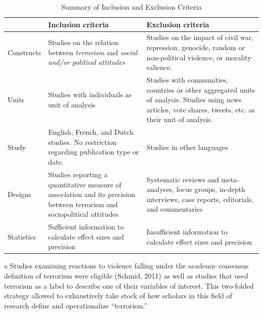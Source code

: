 \vspace{2mm}
\begin{table}[H]
\caption{Summary of Inclusion and Exclusion Criteria}
\label{tab:art4-tab1}
\small
\renewcommand{\arraystretch}{1.5} %
\begin{threeparttable}
\begin{tabular}{L{2cm}L{5.4cm}L{5.4cm}}
\hline
& \textbf{Inclusion criteria} & \textbf{Exclusion criteria} \\ \hline
Constructs & Studies on the relation between \textit{terrorism} \hspace{2mm}and \textit{social and/or political attitudes} & Studies on the impact of civil war, repression, genocide, random or non-political violence, or morality salience.  \\ 
Units & Studies with individuals as unit of analysis & Studies with communities, countries or other aggregated units of analysis. Studies using news articles, vote shares, tweets, etc. as their unit of analysis. \\ 
Study & English, French, and Dutch studies. No restriction regarding publication type or date.  & Studies in other languages \\
Designs & Studies reporting a quantitative measure of association and its precision between terrorism and sociopolitical attitudes & Systematic reviews and meta-analyses, focus groups, in-depth interviews, case reports, editorials, and commentaries \\
Statistics & Sufficient information to calculate effect sizes and precision & Insufficient information to calculate effect sizes and precision \\ \hline
\end{tabular}
\begin{tablenotes}
\vspace{-5mm}
\singlespacing
\footnotesize
\item[a] Studies examining reactions to violence falling under the academic consensus definition of terrorism were eligible (Schmid, 2011) as well as studies that used terrorism as a label to describe one of their variables of interest. This two-folded strategy allowed to exhaustively take stock of how scholars in this field of research define and operationalize “terrorism.” 

\end{tablenotes}
\end{threeparttable}
\end{table}
